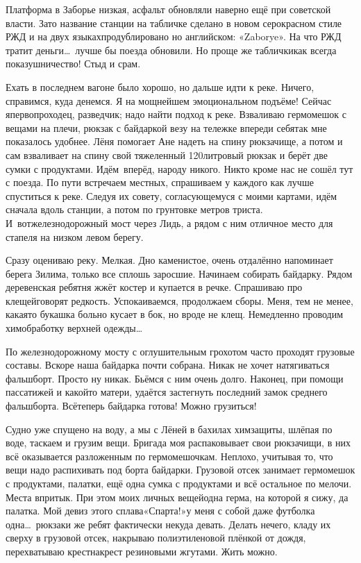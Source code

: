 Платформа в Заборье низкая, асфальт обновляли наверно ещё при советской власти. Зато название станции на табличке сделано в новом серо\sdash красном стиле РЖД и на двух языках\mdash продублировано но английском: «Zaborye». На что РЖД тратит деньги\ldots~лучше бы поезда обновили. Но проще же таблички\mdash как всегда показушничество! Стыд и срам. 

Ехать в последнем вагоне было хорошо, но дальше идти к реке. Ничего, справимся, куда денемся. Я на мощнейшем эмоциональном подъёме! Сейчас я\mdash первопроходец, разведчик; надо найти подход к реке.  Взваливаю гермомешок с вещами на плечи, рюкзак с байдаркой везу на тележке впереди себя\mdash так мне показалось удобнее. Лёня помогает Ане надеть на спину рюкзачище, а потом и сам взваливает на спину свой тяжеленный 120\sdash литровый рюкзак и берёт две сумки с продуктами. Идём~вперёд, народу никого. Никто кроме нас не сошёл тут с поезда. По пути встречаем местных, спрашиваем у каждого как лучше спуститься к реке. Следуя их совету, согласующемуся с моими картами, идём сначала вдоль станции, а потом по грунтовке метров триста. И~вот\mdash железнодорожный мост через Лидь, а рядом с ним отличное место для стапеля на низком левом берегу. 

Сразу оцениваю реку. Мелкая. Дно каменистое, очень отдалённо напоминает берега Зилима, только все сплошь заросшие. Начинаем собирать байдарку. Рядом деревенская ребятня жжёт костер и купается в речке. Спрашиваю про клещей\mdash говорят редкость. Успокаиваемся, продолжаем сборы. Меня, тем не менее, какая\sdash то букашка больно кусает в бок, но вроде не клещ. Немедленно проводим химобработку верхней одежды\ldots~

По железнодорожному мосту с оглушительным грохотом часто проходят грузовые составы. Вскоре наша байдарка почти собрана. Никак не хочет натягиваться фальшборт. Просто ну никак. Бьёмся с ним очень долго. Наконец, при помощи пассатижей и какой\sdash то матери, удаётся застегнуть последний замок среднего фальшборта. Всё\mdash теперь байдарка готова! Можно грузиться! 

Судно уже спущено на воду, а мы с Лёней в бахилах химзащиты, шлёпая по воде, таскаем и грузим вещи. Бригада моя распаковывает свои рюкзачищи, в них всё оказывается разложенным по гермомешочкам. Неплохо, учитывая то, что вещи надо распихивать под борта байдарки. Грузовой отсек занимает гермомешок с продуктами, палатки, ещё одна сумка с продуктами и всё остальное по мелочи. Места впритык. При этом моих личных вещей\mdash одна герма, на которой я сижу, да палатка. Мой девиз этого сплава\mdash «Спарта!»\mdash у меня с собой даже футболка одна\ldots~рюкзаки же ребят фактически некуда девать. Делать нечего, кладу их сверху в грузовой отсек, накрываю полиэтиленовой плёнкой от дождя, перехватываю крест\sdash накрест резиновыми жгутами. Жить можно. 

